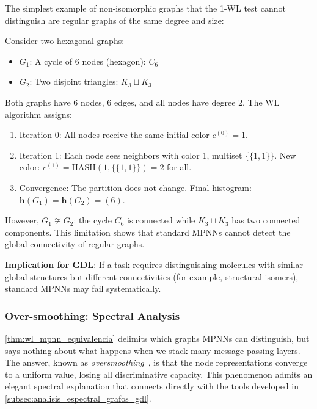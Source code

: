 \begin{example}\label{ex:grafos_wl_indistinguibles}
The simplest example of non-isomorphic graphs that the 1-WL test cannot distinguish are regular graphs of the same degree and size:

Consider two hexagonal graphs:
\begin{itemize}
    \item $G_1$: A cycle of 6 nodes (hexagon): $C_6$
    \item $G_2$: Two disjoint triangles: $K_3 \sqcup K_3$
\end{itemize}

Both graphs have 6 nodes, 6 edges, and all nodes have degree 2. The WL algorithm assigns:
\begin{enumerate}
    \item Iteration 0: All nodes receive the same initial color $c^{(0)} = 1$.
    \item Iteration 1: Each node sees neighbors with color 1, multiset $\{\{1, 1\}\}$. New color: $c^{(1)} = \mathrm{HASH}(1, \{\{1,1\}\}) = 2$ for all.
    \item Convergence: The partition does not change. Final histogram: $\mathbf{h}(G_1) = \mathbf{h}(G_2) = (6)$.
\end{enumerate}

However, $G_1 \not\cong G_2$: the cycle $C_6$ is connected while $K_3 \sqcup K_3$ has two connected components. This limitation shows that standard \glspl{MPNN} cannot detect the global connectivity of regular graphs.

\textbf{Implication for GDL}: If a task requires distinguishing molecules with similar global structures but different connectivities (for example, structural isomers), standard \glspl{MPNN} may fail systematically.
\end{example}

\subsubsection{Over-smoothing: Spectral Analysis}\label{subsubsec:oversmoothing}

\autoref{thm:wl_mpnn_equivalencia} delimits which graphs \glspl{MPNN} can distinguish, but says nothing about what happens when we stack many message-passing layers. The answer, known as \textit{\gls{oversmoothing}}~\citep{li2018deeper}, is that the node representations converge to a uniform value, losing all discriminative capacity. This phenomenon admits an elegant spectral explanation that connects directly with the tools developed in \autoref{subsec:analisis_espectral_grafos_gdl}.

